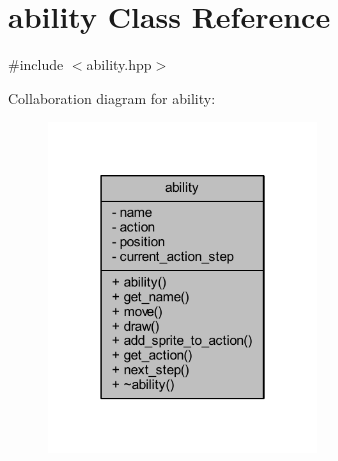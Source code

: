 \hypertarget{classability}{}\section{ability Class Reference}
\label{classability}


{\ttfamily \#include $<$ability.\+hpp$>$}



Collaboration diagram for ability\+:
\nopagebreak
\begin{figure}[H]
\begin{center}
\leavevmode
\includegraphics[width=202pt]{classability__coll__graph}
\end{center}
\end{figure}
